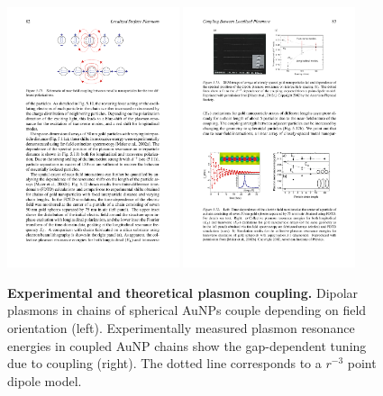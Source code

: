 \documentclass{article}
\begin{document}
\begin{figure}[bt]
\centering
\includegraphics[width=0.45\textwidth]{figures/literature/maier_plasmonics_coupling_diagram}
\quad
\includegraphics[width=0.45\textwidth]{figures/literature/maier_plasmonics_coupling}
\caption[Experimental and theoretical plasmon coupling]{\textbf{Experimental and theoretical plasmon coupling.} Dipolar plasmons in chains of spherical AuNPs couple depending on field orientation \cite{maier2007plasmonics} (left). Experimentally measured plasmon resonance energies in coupled AuNP chains show the gap-dependent tuning due to coupling \cite{maier2002} (right). The dotted line corresponds to a $r^{-3}$ point dipole model.}
\label{fig:maier_plasmon_coupling}
\end{figure}

\end{document}
